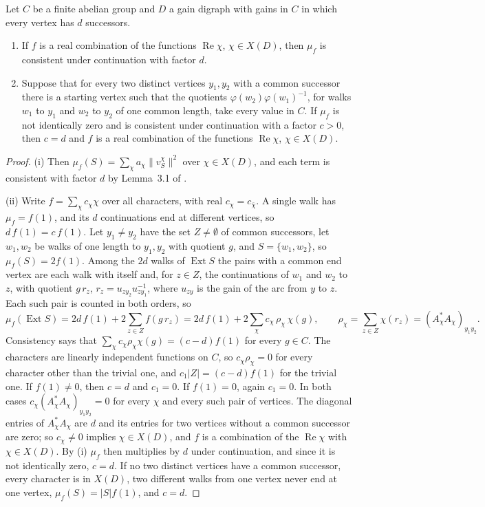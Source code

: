 \begin{theorem}\label{thm:kernel}
Let $C$ be a finite abelian group and $D$ a gain digraph with gains in $C$ in which every vertex has $d$ successors.
\begin{enumerate}[label=(\roman*)]
\item If $f$ is a real combination of the functions $\operatorname{Re}\chi$, $\chi\in X(D)$, then $\mu_f$ is consistent under continuation with factor $d$.
\item Suppose that for every two distinct vertices $y_1,y_2$ with a common successor there is a starting vertex such that the quotients $\varphi(w_2)\varphi(w_1)^{-1}$, for walks $w_1$ to $y_1$ and $w_2$ to $y_2$ of one common length, take every value in $C$. If $\mu_f$ is not identically zero and is consistent under continuation with a factor $c>0$, then $c=d$ and $f$ is a real combination of the functions $\operatorname{Re}\chi$, $\chi\in X(D)$.
\end{enumerate}
\end{theorem}
\begin{proof}
(i) Then $\mu_f(S)=\sum_\chi a_\chi\lVert v^{\chi}_S\rVert^2$ over $\chi\in X(D)$, and each term is consistent with factor $d$ by Lemma~3.1 of \cite{g9}.

(ii) Write $f=\sum_\chi c_\chi\chi$ over all characters, with real $c_\chi=c_{\bar\chi}$. A single walk has $\mu_f=f(1)$, and its $d$ continuations end at different vertices, so $d\,f(1)=c\,f(1)$. Let $y_1\ne y_2$ have the set $Z\ne\emptyset$ of common successors, let $w_1,w_2$ be walks of one length to $y_1,y_2$ with quotient $g$, and $S=\{w_1,w_2\}$, so $\mu_f(S)=2f(1)$. Among the $2d$ walks of $\operatorname{Ext}S$ the pairs with a common end vertex are each walk with itself and, for $z\in Z$, the continuations of $w_1$ and $w_2$ to $z$, with quotient $g\,r_z$, $r_z=u_{zy_2}u_{zy_1}^{-1}$, where $u_{zy}$ is the gain of the arc from $y$ to $z$. Each such pair is counted in both orders, so
\[
\mu_f(\operatorname{Ext}S)=2d\,f(1)+2\sum_{z\in Z}f(g\,r_z)=2d\,f(1)+2\sum_\chi c_\chi\,\rho_\chi\,\chi(g),\qquad\rho_\chi=\sum_{z\in Z}\chi(r_z)=(A_\chi^*A_\chi)_{y_1y_2}.
\]
Consistency says that $\sum_\chi c_\chi\rho_\chi\chi(g)=(c-d)f(1)$ for every $g\in C$. The characters are linearly independent functions on $C$, so $c_\chi\rho_\chi=0$ for every character other than the trivial one, and $c_1\lvert Z\rvert=(c-d)f(1)$ for the trivial one. If $f(1)\ne0$, then $c=d$ and $c_1=0$. If $f(1)=0$, again $c_1=0$. In both cases $c_\chi(A_\chi^*A_\chi)_{y_1y_2}=0$ for every $\chi$ and every such pair of vertices. The diagonal entries of $A_\chi^*A_\chi$ are $d$ and its entries for two vertices without a common successor are zero; so $c_\chi\ne0$ implies $\chi\in X(D)$, and $f$ is a combination of the $\operatorname{Re}\chi$ with $\chi\in X(D)$. By (i) $\mu_f$ then multiplies by $d$ under continuation, and since it is not identically zero, $c=d$. If no two distinct vertices have a common successor, every character is in $X(D)$, two different walks from one vertex never end at one vertex, $\mu_f(S)=\lvert S\rvert f(1)$, and $c=d$.
\end{proof}

